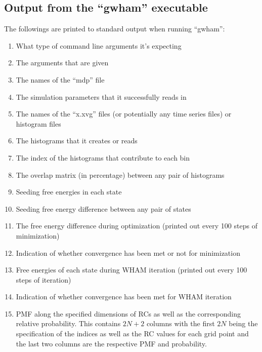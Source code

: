 \subsection{Output from the ``gwham'' executable}
The followings are printed to standard output when running ``gwham'':
\begin{enumerate}
  \item What type of command line arguments it's expecting
  \item The arguments that are given
  \item The names of the ``mdp'' file
  \item The simulation parameters that it successfully reads in
  \item The names of the ``x.xvg'' files (or potentially any time series files)
  or histogram files
  \item The histograms that it creates or reads
  \item The index of the histograms that contribute to each bin
  \item The overlap matrix (in percentage) between any pair of histograms
  \item Seeding free energies in each state
  \item Seeding free energy difference between any pair of states
  \item The free energy difference during optimization (printed out every 100
  steps of minimization)
  \item Indication of whether convergence has been met or not for minimization
  \item Free energies of each state during WHAM iteration (printed out every
  100 steps of iteration)
  \item Indication of whether convergence has been met for WHAM iteration
  \item PMF along the specified dimensions of RCs as well as the corresponding
  relative probability.  This contains $2N+2$ columns with the first $2N$ being
  the specification of the indices as well as the RC values for each grid point
  and the last two columns are the respective PMF and probability.
\end{enumerate}

